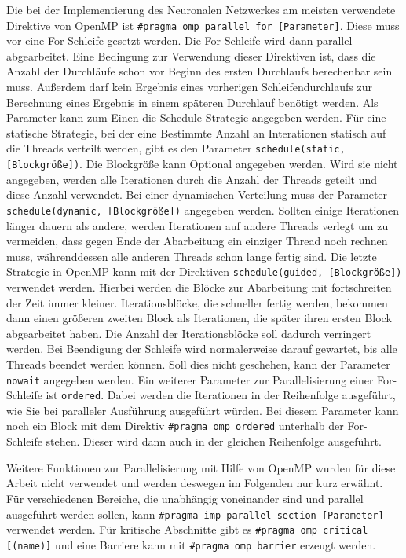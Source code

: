 \documentclass[../main.tex]{subfiles}
\begin{document}
Die bei der Implementierung des Neuronalen Netzwerkes am meisten verwendete Direktive von OpenMP ist \texttt{\#pragma omp parallel for [Parameter]}. Diese muss vor eine For-Schleife gesetzt werden. Die For-Schleife wird dann parallel abgearbeitet. Eine Bedingung zur Verwendung dieser Direktiven ist, dass die Anzahl der Durchläufe schon vor Beginn des ersten Durchlaufs berechenbar sein muss. Außerdem darf kein Ergebnis eines vorherigen Schleifendurchlaufs zur Berechnung eines Ergebnis in einem späteren Durchlauf benötigt werden.
Als Parameter kann zum Einen die Schedule-Strategie angegeben werden. 
Für eine statische Strategie, bei der eine Bestimmte Anzahl an Interationen statisch auf die Threads verteilt werden, gibt es den Parameter \texttt{schedule(static, [Blockgröße])}. Die Blockgröße kann Optional angegeben werden. Wird sie nicht angegeben, werden alle Iterationen durch die Anzahl der Threads geteilt und diese Anzahl verwendet.
Bei einer dynamischen Verteilung muss der Parameter \texttt{schedule(dynamic, [Blockgröße])} angegeben werden. Sollten einige Iterationen länger dauern als andere, werden Iterationen auf andere Threads verlegt um zu vermeiden, dass gegen Ende der Abarbeitung ein einziger Thread noch rechnen muss, währenddessen alle anderen Threads schon lange fertig sind.
Die letzte Strategie in OpenMP kann mit der Direktiven \texttt{schedule(guided, [Blockgröße])} verwendet werden. Hierbei werden die Blöcke zur Abarbeitung mit fortschreiten der Zeit immer kleiner. Iterationsblöcke, die schneller fertig werden, bekommen dann einen größeren zweiten Block als Iterationen, die später ihren ersten Block abgearbeitet haben. Die Anzahl der Iterationsblöcke soll dadurch verringert werden.
Bei Beendigung der Schleife wird normalerweise darauf gewartet, bis alle Threads beendet werden können. Soll dies nicht geschehen, kann der Parameter \texttt{nowait} angegeben werden.
Ein weiterer Parameter zur Parallelisierung einer For-Schleife ist \texttt{ordered}. Dabei werden die Iterationen in der Reihenfolge ausgeführt, wie Sie bei paralleler Ausführung ausgeführt würden. Bei diesem Parameter kann noch ein Block mit dem Direktiv \texttt{\#pragma omp ordered} unterhalb der For-Schleife stehen. Dieser wird dann auch in der gleichen Reihenfolge ausgeführt.

Weitere Funktionen zur Parallelisierung mit Hilfe von OpenMP wurden für diese Arbeit nicht verwendet und werden deswegen im Folgenden nur kurz erwähnt.
Für verschiedenen Bereiche, die unabhängig voneinander sind und parallel ausgeführt werden sollen, kann \texttt{\#pragma imp parallel section [Parameter]} verwendet werden.
Für kritische Abschnitte gibt es \texttt{\#pragma omp critical [(name)]} und eine Barriere kann mit \texttt{\#pragma omp barrier} erzeugt werden.
\end{document}
